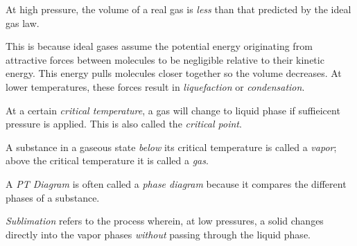 \begin{remark}
    At high pressure, the volume of a real gas is \emph{less} than that predicted by the ideal gas law.
\end{remark}
\begin{explanation}
    This is because ideal gases assume the potential energy originating from attractive forces between molecules to be negligible relative to their kinetic energy. This energy pulls molecules closer together so the volume decreases. At lower temperatures, these forces result in \emph{liquefaction} or \emph{condensation}.
\end{explanation}
\begin{definition}
    At a certain \emph{critical temperature}, a gas will change to liquid phase if suffieicent pressure is applied. This is also called the \emph{critical point}.
\end{definition}
\begin{definition}
    A substance in a gaseous state \emph{below} its critical temperature is called a \emph{vapor}; above the critical temperature it is called a \emph{gas}.
\end{definition}
\begin{remark}
    A \emph{PT Diagram} is often called a \emph{phase diagram} because it compares the different phases of a substance.
\end{remark}
\begin{definition}[Sublimation]
    \emph{Sublimation} refers to the process wherein, at low pressures, a solid changes directly into the vapor phases \emph{without} passing through the liquid phase. 
\end{definition}
